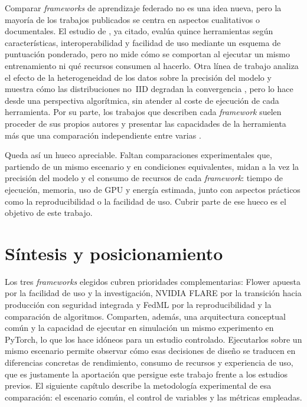 Comparar \textit{frameworks} de aprendizaje federado no es una idea nueva, pero la mayoría
de los trabajos publicados se centra en aspectos cualitativos o documentales. El estudio
de \textcite{riedel2024comparative}, ya citado, evalúa quince herramientas según
características, interoperabilidad y facilidad de uso mediante un esquema de puntuación
ponderado, pero no mide cómo se comportan al ejecutar un mismo entrenamiento ni qué
recursos consumen al hacerlo. Otra línea de trabajo analiza el efecto de la heterogeneidad
de los datos sobre la precisión del modelo y muestra cómo las distribuciones no~IID
degradan la convergencia \parencite{li2020federated}, pero lo hace desde una perspectiva
algorítmica, sin atender al coste de ejecución de cada herramienta. Por su parte, los
trabajos que describen cada \textit{framework} suelen proceder de sus propios autores y
presentar las capacidades de la herramienta más que una comparación independiente entre
varias \parencite{beutel2020flower,roth2022nvflare,he2020fedml}.

Queda así un hueco apreciable. Faltan comparaciones experimentales que, partiendo de un
mismo escenario y en condiciones equivalentes, midan a la vez la precisión del modelo y el
consumo de recursos de cada \textit{framework}: tiempo de ejecución, memoria, uso de GPU y
energía estimada, junto con aspectos prácticos como la reproducibilidad o la facilidad de
uso. Cubrir parte de ese hueco es el objetivo de este trabajo.

\section{Síntesis y posicionamiento}\label{sec:sintesis-posicionamiento}

Los tres \textit{frameworks} elegidos cubren prioridades complementarias: Flower apuesta
por la facilidad de uso y la investigación, NVIDIA FLARE por la transición hacia
producción con seguridad integrada y FedML por la reproducibilidad y la comparación de
algoritmos. Comparten, además, una arquitectura conceptual común y la capacidad de
ejecutar en simulación un mismo experimento en PyTorch, lo que los hace idóneos para un
estudio controlado. Ejecutarlos sobre un mismo escenario permite observar cómo esas
decisiones de diseño se traducen en diferencias concretas de rendimiento, consumo de
recursos y experiencia de uso, que es justamente la aportación que persigue este trabajo
frente a los estudios previos. El siguiente capítulo describe la metodología experimental
de esa comparación: el escenario común, el control de variables y las métricas empleadas.
